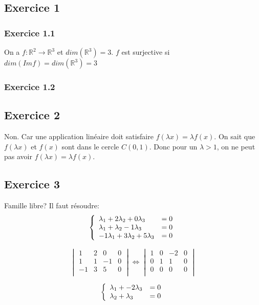 \documentclass[]{book}
\theoremstyle{definition}
\newcommand{\bb}[1]{\mathbb{#1}}
\newcommand{\R}{\bb{R}}
\begin{document}
\subsection*{Exercice 1}
\subsubsection*{Exercice 1.1}
On a $f: \R^2 \to \R^3$ et $dim(\R^3) = 3$. $f$ est surjective si $dim(Im f) = dim(\R^3) = 3$


\subsubsection*{Exercice 1.2}


\subsection*{Exercice 2}
Non. Car une application lin\'eaire doit satisfaire $f(\lambda x) = \lambda f(x)$. On sait que $f(\lambda x)$ et $f(x)$ sont dans le cercle $C(0,1)$. Donc pour un $\lambda > 1$, on ne peut pas avoir $f(\lambda x) = \lambda f(x)$. 



\subsection*{Exercice 3}
Famille libre? Il faut r\'esoudre:
$$
\left\{ 
\begin{array}{l l}
\lambda_{1} + 2\lambda_{2} + 0\lambda_{3} & = 0\\
\lambda_{1} + \lambda_{2} - 1\lambda_{3} & = 0\\
-1\lambda_{1} + 3\lambda_{2} + 5\lambda_{3} & = 0\\
\end{array}
\right. 
$$ 


$$
\begin{vmatrix}
1 & 2  & 0 & 0 \\
1 & 1  & -1 & 0 \\
-1 & 3 & 5 & 0 \\
\end{vmatrix}
\Leftrightarrow
\begin{vmatrix}
1 & 0 & -2 & 0 \\
0 & 1 & 1 & 0  \\
0 & 0 & 0 & 0  \\
\end{vmatrix}
$$

$$
\left\{ 
\begin{array}{l l}
\lambda_{1} + -2\lambda_{3} & = 0\\
\lambda_{2} + \lambda_{3} & = 0\\
\end{array}
\right. 
$$ 
\end{document}
